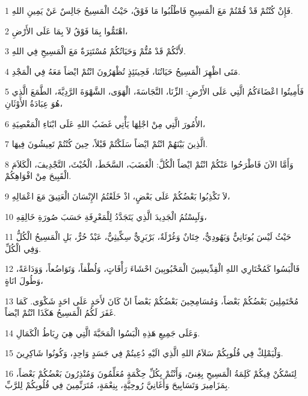 \par 1 فَإِنْ كُنْتُمْ قَدْ قُمْتُمْ مَعَ الْمَسِيحِ فَاطْلُبُوا مَا فَوْقُ، حَيْثُ الْمَسِيحُ جَالِسٌ عَنْ يَمِينِ اللهِ.
\par 2 اهْتَمُّوا بِمَا فَوْقُ لاَ بِمَا عَلَى الأَرْضِ،
\par 3 لأَنَّكُمْ قَدْ مُتُّمْ وَحَيَاتُكُمْ مُسْتَتِرَةٌ مَعَ الْمَسِيحِ فِي اللهِ.
\par 4 مَتَى اظْهِرَ الْمَسِيحُ حَيَاتُنَا، فَحِينَئِذٍ تُظْهَرُونَ انْتُمْ ايْضاً مَعَهُ فِي الْمَجْدِ.
\par 5 فَأَمِيتُوا اعْضَاءَكُمُ الَّتِي عَلَى الأَرْضِ: الزِّنَا، النَّجَاسَةَ، الْهَوَى، الشَّهْوَةَ الرَّدِيَّةَ، الطَّمَعَ الَّذِي هُوَ عِبَادَةُ الأَوْثَانِ،
\par 6 الأُمُورَ الَّتِي مِنْ اجْلِهَا يَأْتِي غَضَبُ اللهِ عَلَى ابْنَاءِ الْمَعْصِيَةِ،
\par 7 الَّذِينَ بَيْنَهُمْ انْتُمْ ايْضاً سَلَكْتُمْ قَبْلاً، حِينَ كُنْتُمْ تَعِيشُونَ فِيهَا.
\par 8 وَأَمَّا الآنَ فَاطْرَحُوا عَنْكُمْ انْتُمْ ايْضاً الْكُلَّ: الْغَضَبَ، السَّخَطَ، الْخُبْثَ، التَّجْدِيفَ، الْكَلاَمَ الْقَبِيحَ مِنْ افْوَاهِكُمْ.
\par 9 لاَ تَكْذِبُوا بَعْضُكُمْ عَلَى بَعْضٍ، اذْ خَلَعْتُمُ الإِنْسَانَ الْعَتِيقَ مَعَ اعْمَالِهِ،
\par 10 وَلَبِسْتُمُ الْجَدِيدَ الَّذِي يَتَجَدَّدُ لِلْمَعْرِفَةِ حَسَبَ صُورَةِ خَالِقِهِ،
\par 11 حَيْثُ لَيْسَ يُونَانِيٌّ وَيَهُودِيٌّ، خِتَانٌ وَغُرْلَةٌ، بَرْبَرِيٌّ سِكِّيثِيٌّ، عَبْدٌ حُرٌّ، بَلِ الْمَسِيحُ الْكُلُّ وَفِي الْكُلِّ.
\par 12 فَالْبَسُوا كَمُخْتَارِي اللهِ الْقِدِّيسِينَ الْمَحْبُوبِينَ احْشَاءَ رَأْفَاتٍ، وَلُطْفاً، وَتَوَاضُعاً، وَوَدَاعَةً، وَطُولَ انَاةٍ،
\par 13 مُحْتَمِلِينَ بَعْضُكُمْ بَعْضاً، وَمُسَامِحِينَ بَعْضُكُمْ بَعْضاً انْ كَانَ لأَحَدٍ عَلَى احَدٍ شَكْوَى. كَمَا غَفَرَ لَكُمُ الْمَسِيحُ هَكَذَا انْتُمْ ايْضاً.
\par 14 وَعَلَى جَمِيعِ هَذِهِ الْبَسُوا الْمَحَبَّةَ الَّتِي هِيَ رِبَاطُ الْكَمَالِ.
\par 15 وَلْيَمْلِكْ فِي قُلُوبِكُمْ سَلاَمُ اللهِ الَّذِي الَيْهِ دُعِيتُمْ فِي جَسَدٍ وَاحِدٍ، وَكُونُوا شَاكِرِينَ.
\par 16 لِتَسْكُنْ فِيكُمْ كَلِمَةُ الْمَسِيحِ بِغِنىً، وَأَنْتُمْ بِكُلِّ حِكْمَةٍ مُعَلِّمُونَ وَمُنْذِرُونَ بَعْضُكُمْ بَعْضاً، بِمَزَامِيرَ وَتَسَابِيحَ وَأَغَانِيَّ رُوحِيَّةٍ، بِنِعْمَةٍ، مُتَرَنِّمِينَ فِي قُلُوبِكُمْ لِلرَّبِّ.
